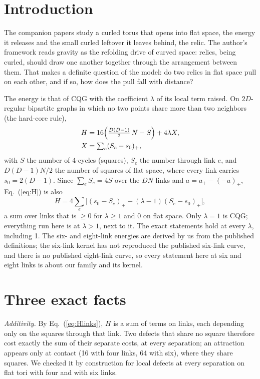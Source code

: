 \documentclass[pre,twocolumn,superscriptaddress,nofootinbib]{revtex4-2}
\begin{document}
\section{Introduction}

The companion papers \cite{paper1,paper2} study a curled torus that opens into flat space, the energy it releases and the
small curled leftover it leaves behind, the relic. The author's framework reads gravity as the refolding drive of curved
space: relics, being curled, should draw one another together through the arrangement between them. That makes a
definite question of the model: do two relics in flat space pull on each other, and if so, how does the pull fall with
distance?

The energy is that of CQG \cite{T25} with the coefficient $\lambda$ of its local term raised. On $2D$-regular bipartite
graphs in which no two points share more than two neighbors (the hard-core rule),
\begin{equation}
\begin{aligned}
H &= 16\Bigl(\tfrac{D(D-1)}{2}\,N - S\Bigr) + 4\lambda X,\\
X &= \textstyle\sum_e (S_e - s_0)_+ ,
\end{aligned}
\label{eq:H}
\end{equation}
with $S$ the number of 4-cycles (squares), $S_e$ the number through link $e$, and $D(D-1)N/2$ the number of squares
of flat space, where every link carries $s_0 = 2(D-1)$. Since $\sum_e S_e = 4S$ over the $DN$ links and
$a = a_+ - (-a)_+$, Eq.~(\ref{eq:H}) is also
\begin{equation}
H = 4\sum_e \bigl[(s_0 - S_e)_+ + (\lambda - 1)(S_e - s_0)_+\bigr],
\label{eq:Hlinks}
\end{equation}
a sum over links that is $\ge 0$ for $\lambda \ge 1$ and $0$ on flat space. Only $\lambda = 1$ is CQG; everything run
here is at $\lambda > 1$, next to it. The exact statements hold at every $\lambda$, including 1. The six- and
eight-link energies are derived by us from the published definitions; the six-link kernel has not reproduced the published six-link curve, and there is no published eight-link curve, so every
statement here at six and eight links is about our family and its kernel.

\section{Three exact facts}

\emph{Additivity.} By Eq.~(\ref{eq:Hlinks}), $H$ is a sum of terms on links, each depending only on the squares through
that link. Two defects that share no square therefore cost exactly the sum of their separate costs, at every
separation; an attraction appears only at contact (16 with four links, 64 with six), where they share squares. We
checked it by construction for local defects at every separation on flat tori with four and with six links.
\end{document}
